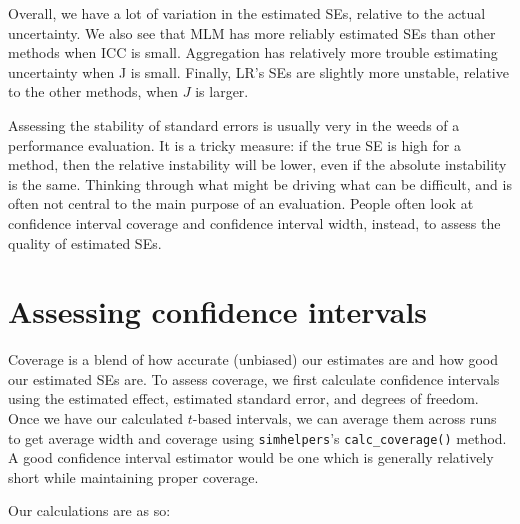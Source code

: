 \documentclass[
]{book}
\begin{document}
Overall, we have a lot of variation in the estimated SEs, relative to the actual uncertainty.
We also see that MLM has more reliably estimated SEs than other methods when ICC is small.
Aggregation has relatively more trouble estimating uncertainty when J is small.
Finally, LR's SEs are slightly more unstable, relative to the other methods, when \(J\) is larger.

Assessing the stability of standard errors is usually very in the weeds of a performance evaluation.
It is a tricky measure: if the true SE is high for a method, then the relative instability will be lower, even if the absolute instability is the same.
Thinking through what might be driving what can be difficult, and is often not central to the main purpose of an evaluation.
People often look at confidence interval coverage and confidence interval width, instead, to assess the quality of estimated SEs.

\section{Assessing confidence intervals}\label{assessing-confidence-intervals}

Coverage is a blend of how accurate (unbiased) our estimates are and how good our estimated SEs are.
To assess coverage, we first calculate confidence intervals using the estimated effect, estimated standard error, and degrees of freedom.
Once we have our calculated \(t\)-based intervals, we can average them across runs to get average width and coverage using \texttt{simhelpers}'s \texttt{calc\_coverage()} method.
A good confidence interval estimator would be one which is generally relatively short while maintaining proper coverage.

Our calculations are as so:
\end{document}
